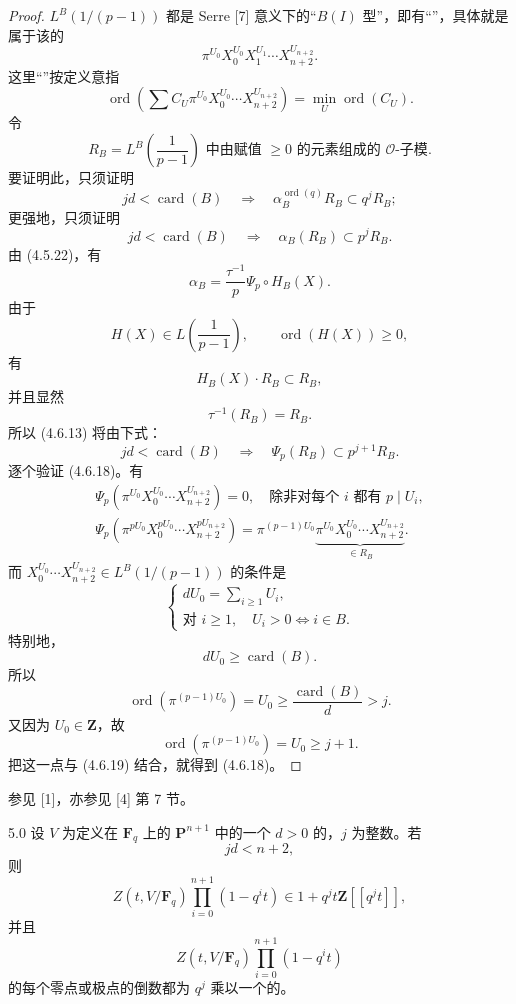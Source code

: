 \begin{proof}
 $L^B(1/(p-1))$ 都是 Serre [7] 意义下的“$B(I)$ 型”，即有“”，具体就是属于该的
\[
\pi^{U_0}X_0^{U_0}X_1^{U_1}\cdots X_{n+2}^{U_{n+2}}.\tag{4.6.9}
\]
这里“”按定义意指
\[
\operatorname{ord}\left(\sum C_U\pi^{U_0}X_0^{U_0}\cdots X_{n+2}^{U_{n+2}}\right)
=\min_U\operatorname{ord}(C_U).\tag{4.6.10}
\]
令
\[
R_B=L^B\left(\frac1{p-1}\right)\text{ 中由赋值 }\ge0\text{ 的元素组成的 }\mathscr O\text{-子模}.\tag{4.6.11}
\]
要证明此，只须证明
\[
jd<\operatorname{card}(B)\quad\Longrightarrow\quad
\alpha_B^{\operatorname{ord}(q)}R_B\subset q^jR_B;\tag{4.6.12}
\]
更强地，只须证明
\[
jd<\operatorname{card}(B)\quad\Longrightarrow\quad\alpha_B(R_B)\subset p^jR_B.\tag{4.6.13}
\]
由 (4.5.22)，有
\[
\alpha_B=\frac{\tau^{-1}}p\Psi_p\circ H_B(X).\tag{4.6.14}
\]
由于
\[
H(X)\in L\left(\frac1{p-1}\right),\qquad\operatorname{ord}(H(X))\ge0,\tag{4.6.15}
\]
有
\[
H_B(X)\cdot R_B\subset R_B,\tag{4.6.16}
\]
并且显然
\[
\tau^{-1}(R_B)=R_B.\tag{4.6.17}
\]
所以 (4.6.13) 将由下式：
\[
jd<\operatorname{card}(B)\quad\Longrightarrow\quad\Psi_p(R_B)\subset p^{j+1}R_B.\tag{4.6.18}
\]
逐个验证 (4.6.18)。有
\[
\begin{gathered}
\Psi_p(\pi^{U_0}X_0^{U_0}\cdots X_{n+2}^{U_{n+2}})=0,
\quad\text{除非对每个 }i\text{ 都有 }p\mid U_i,\\
\Psi_p(\pi^{pU_0}X_0^{pU_0}\cdots X_{n+2}^{pU_{n+2}})
=\pi^{(p-1)U_0}\underbrace{\pi^{U_0}X_0^{U_0}\cdots X_{n+2}^{U_{n+2}}}_{\in R_B}.
\end{gathered}\tag{4.6.19}
\]
而 $X_0^{U_0}\cdots X_{n+2}^{U_{n+2}}\in L^B(1/(p-1))$ 的条件是
\[
\begin{cases}
dU_0=\sum_{i\ge1}U_i,\\
\text{对 }i\ge1,\quad U_i>0\Longleftrightarrow i\in B.
\end{cases}\tag{4.6.20}
\]
特别地，
\[
dU_0\ge\operatorname{card}(B).\tag{4.6.21}
\]
所以
\[
\operatorname{ord}(\pi^{(p-1)U_0})=U_0\ge\frac{\operatorname{card}(B)}d>j.\tag{4.6.22}
\]
又因为 $U_0\in\mathbf Z$，故
\[
\operatorname{ord}(\pi^{(p-1)U_0})=U_0\ge j+1.\tag{4.6.23}
\]
把这一点与 (4.6.19) 结合，就得到 (4.6.18)。
\end{proof}
参见 [1]，亦参见 [4] 第 7 节。
\begin{SGAresult}{}{5.0}
设 $V$ 为定义在 $\mathbf F_q$ 上的 $\mathbf P^{n+1}$ 中的一个 $d>0$ 的，$j$ 为整数。若
\[
jd<n+2,\tag{5.0.1}
\]
则
\[
Z(t,V/\mathbf F_q)\prod_{i=0}^{n+1}(1-q^it)\in1+q^jt\mathbf Z[[q^jt]],\tag{5.0.2}
\]
并且
\[
Z(t,V/\mathbf F_q)\prod_{i=0}^{n+1}(1-q^it)\tag{5.0.3}
\]
的每个零点或极点的倒数都为 $q^j$ 乘以一个的。
\end{SGAresult}
